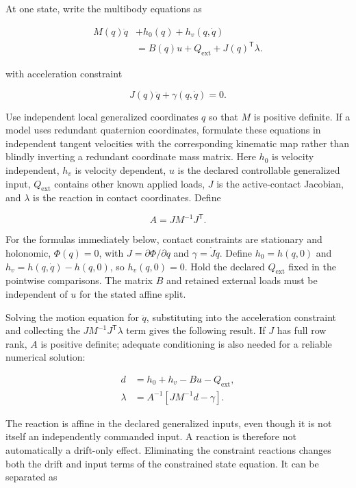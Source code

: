 At one state, write the multibody equations as

\begin{equation}
\begin{aligned}
M(q)\ddot q&+h_0(q)+h_v(q,\dot q)\\
&=B(q)u+Q_{\mathrm{ext}}+J(q)^\mathsf{T}\lambda.
\end{aligned}
\label{eq-grf-multibody}
\end{equation}

with acceleration constraint

\[
J(q)\ddot q+\gamma(q,\dot q)=0.
\]

Use independent local generalized coordinates \(q\) so that \(M\) is positive definite. If a model uses redundant quaternion coordinates, formulate these equations in independent tangent velocities with the corresponding kinematic map rather than blindly inverting a redundant coordinate mass matrix. Here \(h_0\) is velocity independent, \(h_v\) is velocity dependent, \(u\) is the declared controllable generalized input, \(Q_{\mathrm{ext}}\) contains other known applied loads, \(J\) is the active-contact Jacobian, and \(\lambda\) is the reaction in contact coordinates. Define

\[
A=JM^{-1}J^\mathsf{T}.
\]

For the formulas immediately below, contact constraints are stationary and holonomic, \(\Phi(q)=0\), with \(J=\partial\Phi/\partial q\) and \(\gamma=\dot J\dot q\). Define \(h_0=h(q,0)\) and \(h_v=h(q,\dot q)-h(q,0)\), so \(h_v(q,0)=0\). Hold the declared \(Q_{\mathrm{ext}}\) fixed in the pointwise comparisons. The matrix \(B\) and retained external loads must be independent of \(u\) for the stated affine split.

Solving the motion equation for \(\ddot q\), substituting into the acceleration constraint and collecting the \(JM^{-1}J^\mathsf{T}\lambda\) term gives the following result. If \(J\) has full row rank, \(A\) is positive definite; adequate conditioning is also needed for a reliable numerical solution:

\begin{equation}
\begin{aligned}
d&=h_0+h_v-Bu-Q_{\mathrm{ext}},\\
\lambda&=A^{-1}\left[JM^{-1}d-\gamma\right].
\end{aligned}
\label{eq-grf-lambda}
\end{equation}

The reaction is affine in the declared generalized inputs, even though it is not itself an independently commanded input. A reaction is therefore not automatically a drift-only effect. Eliminating the constraint reactions changes both the drift and input terms of the constrained state equation. It can be separated as

